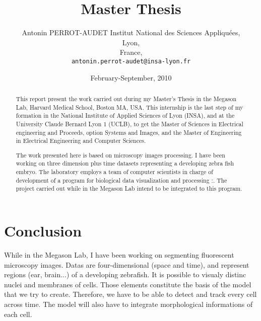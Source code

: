 








\title{Master Thesis} 
\author{Antonin PERROT-AUDET
  Institut National des Sciences Appliquées,\\
  Lyon,\\
  France,\\
  \texttt{antonin.perrot-audet@insa-lyon.fr}}   
\date{February-September, 2010} 
\maketitle



\begin{abstract}
  This report present the work carried out during my Master's Thesis in the Megason Lab, Harvard Medical School, Boston MA, USA.
  This internship is the last step of my formation in the National Institute of Applied Sciences of Lyon (INSA), and at the University Claude Bernard Lyon 1 (UCLB), to get the Master of Sciences in Electrical engineering and Proceeds, option Systems and Images, and the Master of Engineering in Electrical Engineering and Computer Sciences.

  The work presented here is based on microscopy images processing. I have been working on three dimension plus time datasets representing a developing zebra fish embryo. 
  The laboratory employs a team of computer scientists in charge of development of a program for biological data visualization and processing :{\gofigure}\cite{refGofigure2}.
  The project carried out while in the Megason Lab intend to be integrated to this program.
  
\tableofcontents  
  
 
\end{abstract}







%

\chapter{Conclusion}





While in the Megason Lab, I have been working on segmenting fluorescent microscopy images.
Datas are four-dimensional (space and time), and represent regions (ear, brain...) of a developing zebrafish.
It is possible to visualy distinc nuclei and membranes of cells. Those elements constitute the basis of the model that we try to create.
Therefore, we have to be able to detect and track every cell across time. The model will also have to integrate morphological informations of each cell.

